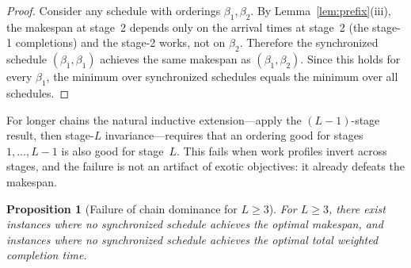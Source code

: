 \documentclass[sn-mathphys,NameDate]{sn-jnl}
\theoremstyle{thmstyleone}
\newtheorem{proposition}[theorem]{Proposition}
\theoremstyle{thmstylethree}
\theoremstyle{thmstyletwo}
\begin{document}
\begin{proof}
Consider any schedule with orderings $\beta_1, \beta_2$. By
Lemma~\ref{lem:prefix}(iii), the makespan at stage~2 depends
only on the arrival times at stage~2 (the stage-1 completions)
and the stage-2 works, not on $\beta_2$. Therefore the
synchronized schedule $(\beta_1, \beta_1)$ achieves the same
makespan as $(\beta_1, \beta_2)$. Since this holds for every
$\beta_1$, the minimum over synchronized schedules equals the
minimum over all schedules.
\end{proof}

For longer chains the natural inductive extension---apply the
$(L-1)$-stage result, then stage-$L$ invariance---requires
that an ordering good for stages $1, \ldots, L{-}1$ is also
good for stage~$L$. This fails when work profiles invert
across stages, and the failure is not an artifact of exotic
objectives: it already defeats the makespan.

\begin{proposition}[Failure of chain dominance for $L \geq 3$]
\label{prop:chain-failure}
For $L \geq 3$, there exist instances where no synchronized
schedule achieves the optimal makespan, and instances where no
synchronized schedule achieves the optimal total weighted
completion time.
\end{proposition}
\end{document}
